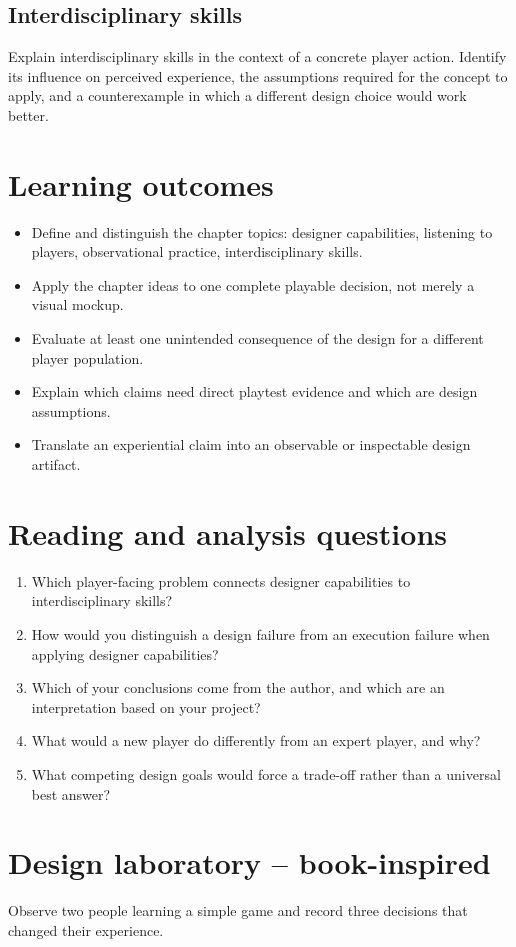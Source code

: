 \documentclass[11pt]{article}
\begin{document}
\subsection{Interdisciplinary skills}
Explain interdisciplinary skills in the context of a concrete player action. Identify its influence on perceived experience, the assumptions required for the concept to apply, and a counterexample in which a different design choice would work better.


\section{Learning outcomes}
\begin{itemize}
\item Define and distinguish the chapter topics: designer capabilities, listening to players, observational practice, interdisciplinary skills.
\item Apply the chapter ideas to one complete playable decision, not merely a visual mockup.
\item Evaluate at least one unintended consequence of the design for a different player population.
\item Explain which claims need direct playtest evidence and which are design assumptions.
\item Translate an experiential claim into an observable or inspectable design artifact.
\end{itemize}

\section{Reading and analysis questions}
\begin{enumerate}
\item Which player-facing problem connects designer capabilities to interdisciplinary skills?
\item How would you distinguish a design failure from an execution failure when applying designer capabilities?
\item Which of your conclusions come from the author, and which are an interpretation based on your project?
\item What would a new player do differently from an expert player, and why?
\item What competing design goals would force a trade-off rather than a universal best answer?
\end{enumerate}

\section{Design laboratory -- book-inspired}
Observe two people learning a simple game and record three decisions that changed their experience.
\end{document}
